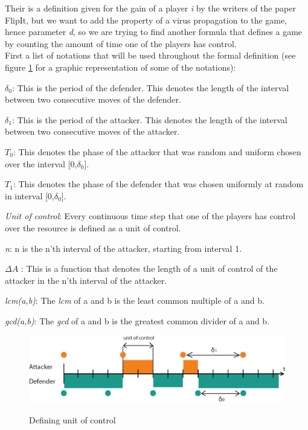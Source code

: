 Their is a definition given for the gain of a player \textit{i} by the writers of the paper FlipIt, but we want to add the property of a virus propagation to the game, hence parameter \textit{d}, so we are trying to find another formula that defines a game by counting the amount of time one of the players has control. \\

First a list of notations that will be used throughout the formal definition (see figure \ref{fig:notations} for a graphic representation of some of the notations):
\begin{description}
\item $\delta_{0}$: This is the period of the defender. This denotes the length of the interval between two consecutive moves of the defender. 
\item $\delta_{1}$: This is the period of the attacker. This denotes the length of the interval between two consecutive moves of the attacker.
\item \textit{$T_{0}$}: This denotes the phase of the attacker that was random and uniform chosen over the interval [0,$\delta_{0}$].
\item \textit{$T_{1}$}: This denotes the phase of the defender that was chosen uniformly at random in interval [0,$\delta_{0}$].
\item \textit{Unit of control}: Every continuous time step that one of the players has control over the resource is defined as a unit of control. 
\item \textit{n}: n is the n'th interval of the attacker, starting from interval 1.
\item $\Delta A$ : This is a function that denotes the length of a unit of control of the attacker in the n'th interval of the attacker.
\item \textit{lcm(a,b)}: The \textit{lcm} of a and b is the least common multiple of a and b.
\item \textit{gcd(a,b)}: The \textit{gcd} of a and b is the greatest common divider of a and b.
\end{description}
\begin{figure}[hbtp]
\caption{Defining unit of control}
\centering
\includegraphics[scale=1]{Images/FlipSpel.png}
\label{fig:notations}
\end{figure}

